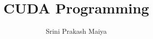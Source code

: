\documentclass[14pt]{report}
\title{CUDA Programming}
\author{Srini Prakash Maiya}
\begin{document}
\maketitle
\pagebreak
\tableofcontents
\pagebreak




\end{document}
